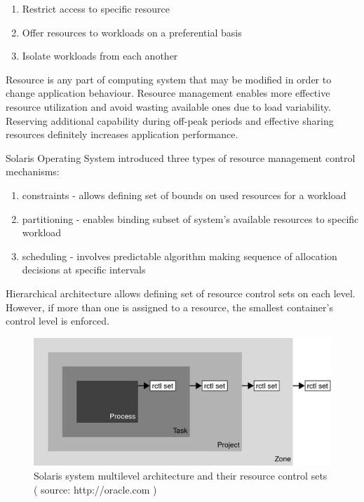 \documentclass[11pt]{book}
\begin{document}
      \begin{enumerate}
        \item{Restrict access to specific resource}
        \item{Offer resources to workloads on a preferential basis}
        \item{Isolate workloads from each another}
      \end{enumerate}
	
      Resource is any part of computing system that may be modified in order to change application behaviour. Resource
      management enables more effective resource utilization and avoid wasting available ones due to load variability.
      Reserving additional capability during off-peak periods and effective sharing resources definitely increases
      application performance.
      
      Solaris Operating System introduced three types of resource management control mechanisms:

      \begin{enumerate}
        \item{constraints - allows defining set of bounds on used resources for a workload}
        \item{partitioning - enables binding subset of system's available resources to specific workload}
        \item{scheduling - involves predictable algorithm making sequence of allocation decisions at specific intervals}
      \end{enumerate}

      Hierarchical architecture allows defining set of resource control sets on each level. However, if more
      than one is assigned to a resource, the smallest container's control level is enforced. 

      \begin{figure}[H]
        \includegraphics[width=\textwidth]{img/rctrl.png}
        \caption{Solaris system multilevel architecture and their resource control sets ( source: http://oracle.com ) }
		  \end{figure}
                
\end{document}
